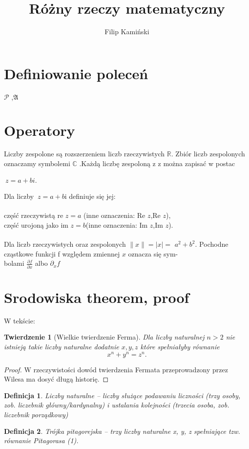 \documentclass[a4paper, 12pt]{amsart}
\author{Filip Kamiński}
\title{Różny rzeczy matematyczny}
\begin{document}
\maketitle
\section{Definiowanie poleceń}
\newcommand{\A}{\mathfrak {A}}
\renewcommand{\P}{\mathcal {P}}
$\P$ ,$\A$
\section{Operatory}

Liczby zespolone są rozszerzeniem liczb rzeczywistych $\mathbb{R}$. Zbiór liczb
zespolonych oznaczamy symbolemi  $\mathbb{C}$ .Każdą liczbę zespoloną z z można
zapisać w postac
\begin{center}
$\ z = a + bi$.
\end{center}

Dla liczby $\ z = a + b$i definiuje się jej:\\
\\
część rzeczywistą re $z = a$ (inne oznaczenia: Re $z$,Re $z$),\\
część urojoną jako im  $z = b$(inne oznaczenia: Im $z$,Im $z$).\\
\\
Dla liczb rzeczywistych oraz zespolonych $\| x\| = | x| = $ $a^{2} + b^{2} $.
Pochodne cząstkowe funkcji f względem zmiennej $x$ oznacza się sym-\\bolami $\frac{\partial f}{\partial x}$ albo $\partial_x  f$

\section{Srodowiska theorem, proof}
\newtheorem{twierdzenie}{Twierdzenie}
\theoremstyle{definicja}
\newtheorem{definicja}{Definicja}
W tekście:
\begin{twierdzenie}[Wielkie twierdzenie Ferma]
Dla liczby naturalnej $n>2$ nie istnieją takie liczby naturalne
dodatnie $x,y,z $ które spełniałyby równanie
\begin{equation}\label{my}
x^{n}+y^{n}=z^{n}.
\end{equation}
\end{twierdzenie}
\begin{proof}
W rzeczywistości dowód twierdzenia Fermata przeprowadzony
przez Wilesa ma dosyć długą historię.
\end{proof}
\begin{definicja}
Liczby naturalne – liczby służące podawaniu liczności
(trzy osoby, zob. liczebnik główny/kardynalny) i ustalania kolejności
(trzecia osoba, zob. liczebnik porządkowy)
\end{definicja}
\begin{definicja}
Trójka pitagorejska – trzy liczby naturalne x, y, z spełniające tzw. równanie Pitagorasa (1).
\end{definicja}
\end{document}
